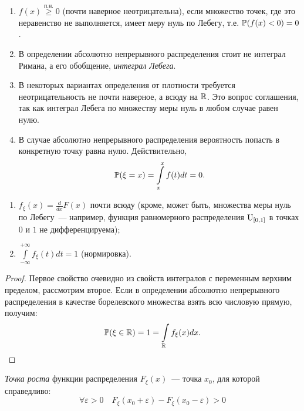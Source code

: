 \begin{rmrk}
\begin{enumerate}\leavevmode
    \item 
        $f(x) \overset{\text{п.н.}}{\geqslant} 0$ (почти наверное неотрицательна), если множество точек, где это неравенство не выполняется, имеет меру нуль по Лебегу, т.е. $\operatorname{\mathbb{P}}(f(x) < 0) = 0$.
    \item 
        В определении абсолютно непрерывного распределения стоит не интеграл Римана, а его обобщение, \textit{интеграл Лебега}.
    \item 
        В некоторых вариантах определения от плотности требуется неотрицательность не почти наверное, а всюду на $\mathbb{R}$. 
        Это вопрос соглашения, так как интеграл Лебега по множеству меры нуль в любом случае равен нулю.
    \item 
        В случае абсолютно непрерывного распределения вероятность попасть в конкретную точку равна нулю. Действительно,
        \begin{equation*}
            \operatorname{\mathbb{P}}(\xi = x) = \int\limits_{x}^{x} f(t)dt = 0.
        \end{equation*}
\end{enumerate}
\end{rmrk}

\begin{namedthm}\leavevmode
\begin{enumerate}
    \item $f_{\xi}(x) = \frac{d}{dx}F(x)$ почти всюду (кроме, может быть, множества меры нуль по Лебегу~--- например, функция равномерного распределения $\operatorname{\mathrm{U}}_{[0, 1]}$ в точках $0$ и $1$ не дифференцируема);
    \item $\int\limits_{-\infty}^{+\infty} f_\xi(t) dt = 1$ (нормировка).
\end{enumerate}
\end{namedthm}
\begin{proof}
    Первое свойство очевидно из свойств интегралов с переменным верхним пределом, рассмотрим второе. 
    Если в определении абсолютно непрерывного распределения в качестве борелевского множества взять всю числовую прямую, получим: 
    \begin{equation*}
        \operatorname{\mathbb{P}}(\xi \in \mathbb{R})=1=\int\limits_{\mathbb{R}} f_{\xi}(x) dx.
    \end{equation*}
\end{proof}

\begin{defn}
    \textit{Точка роста} функции распределения $F_\xi(x)$~--- точка $x_0$, для которой справедливо:
\begin{equation*}
    \forall \varepsilon > 0 \quad F_\xi(x_0 + \varepsilon) - F_\xi(x_0 - \varepsilon) > 0
\end{equation*}
\end{defn}

